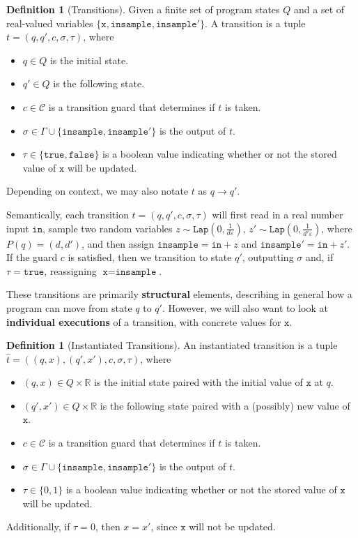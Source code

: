 \documentclass[12pt]{article}
\newcommand{\RR}{\mathbb{R}}
\newcommand{\Lap}{\texttt{Lap}}
\theoremstyle{definition}
\newtheorem{defn}[thm]{Definition}
\begin{document}
\begin{defn}[Transitions]
    Given a finite set of program states $Q$ and a set of real-valued variables $\{\texttt{x}, \texttt{insample}, \texttt{insample}'\}$. A transition is a tuple $t = (q, q', c, \sigma, \tau)$, where \begin{itemize}
        \item $q\in Q$ is the initial state.
        \item $q'\in Q$ is the following state.
        \item $c\in \mathcal{C}$ is a transition guard that determines if $t$ is taken.
        \item $\sigma \in \Gamma\cup\{\texttt{insample}, \texttt{insample}'\}$ is the output of $t$.
        \item $\tau\in\{\texttt{true}, \texttt{false}\}$ is a boolean value indicating whether or not the stored value of $\texttt{x}$ will be updated.
    \end{itemize}
    Depending on context, we may also notate $t$ as $q\to q'$. 
\end{defn}

Semantically, each transition $t = (q, q', c, \sigma, \tau)$ will first read in a real number input $\texttt{in}$, sample two random variables $z\sim\Lap(0, \frac{1}{d\varepsilon})$, $z'\sim\Lap(0, \frac{1}{d'\varepsilon})$, where $P(q) = (d, d')$, and then assign $\texttt{insample} = \texttt{in} + z$ and $\texttt{insample}' = \texttt{in} + z'$. 
If the guard $c$ is satisfied, then we transition to state $q'$, outputting $\sigma$ and, if $\tau = \texttt{true}$, reassigning $\texttt{x} = \texttt{insample}$. 

These transitions are primarily \textbf{structural} elements, describing in general how a program can move from state $q$ to $q'$. However, we will also want to look at \textbf{individual executions} of a transition, with concrete values for $\texttt{x}$. 

\begin{defn}[Instantiated Transitions]
    An instantiated transition is a tuple $\hat{t} = ((q, x), (q', x'), c, \sigma, \tau)$, where \begin{itemize}
        \item $(q, x)\in Q\times \RR$ is the initial state paired with the initial value of $\texttt{x}$ at $q$.
        \item $(q', x')\in Q\times \RR$ is the following state paired with a (possibly) new value of $\texttt{x}$. 
        \item $c\in \mathcal{C}$ is a transition guard that determines if $t$ is taken.
        \item $\sigma \in \Gamma\cup\{\texttt{insample}, \texttt{insample}'\}$ is the output of $t$.
        \item $\tau\in\{0, 1\}$ is a boolean value indicating whether or not the stored value of $\texttt{x}$ will be updated.
    \end{itemize}
    Additionally, if $\tau = 0$, then $x = x'$, since $\texttt{x}$ will not be updated. 
\end{defn}
\end{document}
